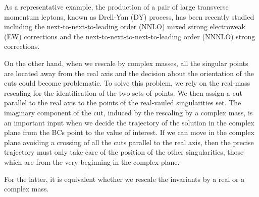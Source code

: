 
As a representative example, the production of a pair of large transverse momentum leptons, known as Drell-Yan (DY) process, has been recently studied including the next-to-next-to-leading order (NNLO) mixed strong electroweak (EW) corrections and the next-to-next-to-next-to-leading order (NNNLO) strong corrections.


On the other hand, when we rescale by complex masses, all the singular points
are located away from the real axis
and the decision about the orientation of the cuts could become problematic.
To solve this problem,
we rely on the real-mass rescaling
for the identification of the two sets of points.
We then assign a cut parallel to the real axis
to the points of the real-vauled singularities set.
The imaginary component of the cut, induced by the rescaling by a complex mass,
is an important input when we decide the
trajectory of the solution in the complex plane
from the BCs point to the value of interest.
If we can move in the complex plane
avoiding a crossing of all the cuts parallel to the real axis,
then the precise trajectory must only take care of the position
of the other singularities,
those which are from the very beginning in the complex plane.




For the latter,
it is equivalent whether we rescale the invariants
by a real or a complex mass.














